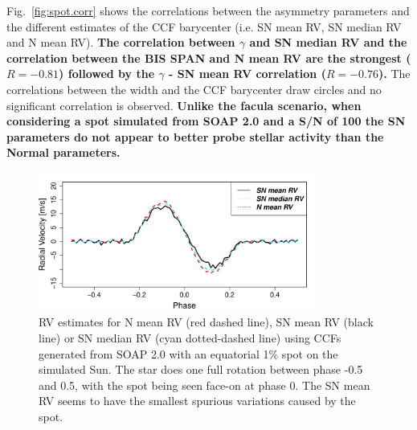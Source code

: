 \documentclass{aa}
\begin{document}
Fig.~\ref{fig:spot.corr} shows the correlations between the asymmetry parameters and the different estimates of the CCF barycenter (i.e. SN mean RV, SN median RV and N mean RV). {\bf{The correlation between $\gamma$ and SN median RV and the correlation between the BIS SPAN and N mean RV are the strongest ($R=-0.81$) followed by the $\gamma$ - SN mean RV correlation ($R=-0.76$).}} 
The correlations between the width and the CCF barycenter draw circles and no significant correlation is observed. 
{\bf Unlike the facula scenario, when considering a spot simulated from SOAP 2.0 and a S/N of 100 the SN parameters do not appear to better probe stellar activity than the Normal parameters.}

\begin{figure}[htbp]
\begin{center}
\includegraphics[width=3.6in]{RV_comparison_SPOT_withNoise.pdf} 
\caption{RV estimates for N mean RV (red dashed line),  SN mean RV (black line) or SN median RV (cyan dotted-dashed line) using CCFs generated from SOAP 2.0 with an equatorial 1\% spot on the simulated Sun. The star does one full rotation between phase -0.5 and 0.5, with the spot being seen face-on at phase 0. The SN mean RV seems to have the smallest spurious variations caused by the spot.}
    \label{fig:spot}
\end{center}
\end{figure}
\end{document}
